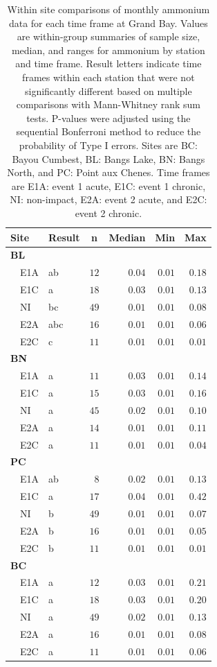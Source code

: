 \documentclass[letterpaper,12pt]{article}\usepackage[]{graphicx}\usepackage[]{color}
\begin{document}
\begin{table}[!tbp]
\caption{Within site comparisons  of monthly ammonium data for each time frame at Grand Bay.  Values are within-group summaries of sample size, median, and ranges for ammonium by station and time frame.  Result letters indicate time frames within each station that were not significantly different based on multiple comparisons with Mann-Whitney rank sum tests.  P-values were adjusted using the sequential Bonferroni method to reduce the probability of Type I errors. Sites are BC: Bayou Cumbest, BL: Bangs Lake, BN: Bangs North, and PC: Point aux Chenes.  Time frames are E1A: event 1 acute, E1C: event 1 chronic, NI: non-impact, E2A: event 2 acute, and E2C: event 2 chronic.\label{tab:ammontab}} 
\begin{center}
\begin{tabular}{llrrrr}
\hline\hline
\multicolumn{1}{l}{Site}&\multicolumn{1}{c}{Result}&\multicolumn{1}{c}{n}&\multicolumn{1}{c}{Median}&\multicolumn{1}{c}{Min}&\multicolumn{1}{c}{Max}\tabularnewline
\hline
{\bfseries BL}&&&&&\tabularnewline
~~E1A&ab&$12$&$0.04$&$0.01$&$0.18$\tabularnewline
~~E1C&a&$18$&$0.03$&$0.01$&$0.13$\tabularnewline
~~NI&bc&$49$&$0.01$&$0.01$&$0.08$\tabularnewline
~~E2A&abc&$16$&$0.01$&$0.01$&$0.06$\tabularnewline
~~E2C&c&$11$&$0.01$&$0.01$&$0.01$\tabularnewline
\hline
{\bfseries BN}&&&&&\tabularnewline
~~E1A&a&$11$&$0.03$&$0.01$&$0.14$\tabularnewline
~~E1C&a&$15$&$0.03$&$0.01$&$0.16$\tabularnewline
~~NI&a&$45$&$0.02$&$0.01$&$0.10$\tabularnewline
~~E2A&a&$14$&$0.01$&$0.01$&$0.11$\tabularnewline
~~E2C&a&$11$&$0.01$&$0.01$&$0.04$\tabularnewline
\hline
{\bfseries PC}&&&&&\tabularnewline
~~E1A&ab&$ 8$&$0.02$&$0.01$&$0.13$\tabularnewline
~~E1C&a&$17$&$0.04$&$0.01$&$0.42$\tabularnewline
~~NI&b&$49$&$0.01$&$0.01$&$0.07$\tabularnewline
~~E2A&b&$16$&$0.01$&$0.01$&$0.05$\tabularnewline
~~E2C&b&$11$&$0.01$&$0.01$&$0.01$\tabularnewline
\hline
{\bfseries BC}&&&&&\tabularnewline
~~E1A&a&$12$&$0.03$&$0.01$&$0.21$\tabularnewline
~~E1C&a&$18$&$0.03$&$0.01$&$0.20$\tabularnewline
~~NI&a&$49$&$0.02$&$0.01$&$0.13$\tabularnewline
~~E2A&a&$16$&$0.01$&$0.01$&$0.08$\tabularnewline
~~E2C&a&$11$&$0.01$&$0.01$&$0.06$\tabularnewline
\hline
\end{tabular}\end{center}

\end{table}
\end{document}
